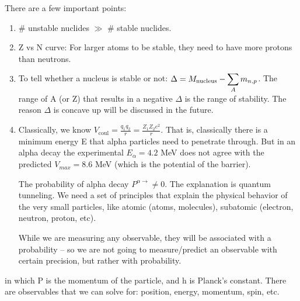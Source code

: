 \documentclass{school-22.101-notes}
\begin{document}
There are a few important points:
\begin{enumerate}
\item \# unstable nuclides $\gg$ \# stable nuclides.
\item Z vs N curve: For larger atoms to be stable, they need to have more protons than neutrons. 
\item To tell whether a nucleus is stable or not: $\Delta = M_{\mathrm{nucleus}} - \displaystyle\sum_A m_{n,p} $. The range of A (or Z) that results in a negative $\Delta$ is the range of stability. The reason $\Delta$ is concave up will be discussed in the future.
\item Classically, we know $V_{\mathrm{coul}} = \frac{q_1 q_2}{r} = \frac{Z_1 Z_2 e^2}{r}$. That is, classically there is a minimum energy E that alpha particles need to penetrate through. But in an alpha decay  the experimental $E_{\alpha} = 4.2$ MeV does not agree with the predicted $V_{max} = 8.6$ MeV (which is the potential of the barrier).

The probability of alpha decay $P^{\alpha \to} \neq 0$. The explanation is quantum tunneling. We need a set of principles that explain the physical behavior of the very small particles, like atomic (atoms, molecules), subatomic (electron, neutron, proton, etc). 

While we are measuring any observable, they will be associated with a probability -- so we are not going to measure/predict an observable with certain precision, but rather with probability. 
\end{enumerate}


in which P is the momentum of the particle, and h is Planck's constant. There are observables that we can solve for: position, energy, momentum, spin, etc. 


\end{document}
